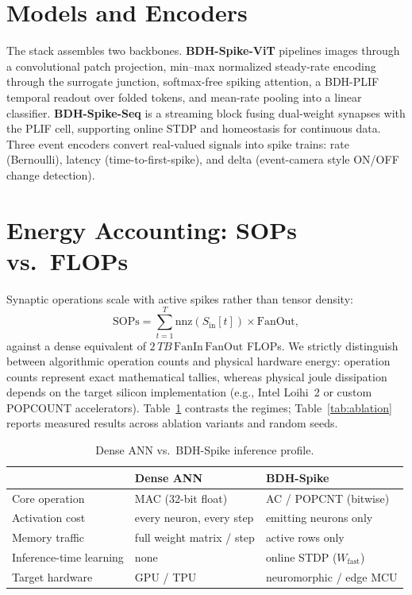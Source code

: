 \documentclass[11pt]{article}
\newcommand{\Wfast}{W_{\text{fast}}}
\begin{document}
\section{Models and Encoders}
The stack assembles two backbones. \textbf{BDH-Spike-ViT} pipelines images
through a convolutional patch projection, min--max normalized steady-rate
encoding through the surrogate junction, softmax-free spiking attention, a
BDH-PLIF temporal readout over folded tokens, and mean-rate pooling into a
linear classifier. \textbf{BDH-Spike-Seq} is a streaming block fusing
dual-weight synapses with the PLIF cell, supporting online STDP and
homeostasis for continuous data. Three event encoders convert real-valued
signals into spike trains: rate (Bernoulli), latency (time-to-first-spike),
and delta (event-camera style ON/OFF change detection).

\section{Energy Accounting: SOPs vs.\ FLOPs}
Synaptic operations scale with active spikes rather than tensor density:
\begin{equation}
\text{SOPs} = \sum_{t=1}^{T} \mathrm{nnz}(S_{\text{in}}[t]) \times
\text{FanOut},
\end{equation}
against a dense equivalent of $2\,T B\,\text{FanIn}\,\text{FanOut}$ FLOPs.
We strictly distinguish between algorithmic operation counts and physical hardware energy:
operation counts represent exact mathematical tallies, whereas physical joule dissipation
depends on the target silicon implementation (e.g., Intel Loihi~2 or custom POPCOUNT accelerators).
Table~\ref{tab:energy} contrasts the regimes; Table~\ref{tab:ablation}
reports measured results across ablation variants and random seeds.

\begin{table}[h]
\centering
\caption{Dense ANN vs.\ BDH-Spike inference profile.}
\label{tab:energy}
\begin{small}
\begin{tabular}{lll}
\toprule
 & Dense ANN & BDH-Spike \\
\midrule
Core operation & MAC (32-bit float) & AC / POPCNT (bitwise) \\
Activation cost & every neuron, every step & emitting neurons only \\
Memory traffic & full weight matrix / step & active rows only \\
Inference-time learning & none & online STDP ($\Wfast$) \\
Target hardware & GPU / TPU & neuromorphic / edge MCU \\
\bottomrule
\end{tabular}
\end{small}
\end{table}
\end{document}
